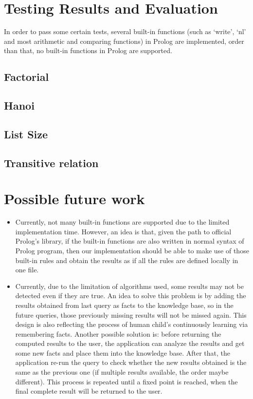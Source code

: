 \documentclass[11pt,a4paper]{report}
\begin{document}
\section*{Testing Results and Evaluation}
In order to pass some certain tests, several built-in functions (such as `write', `nl' and most arithmetic and comparing functions) in Prolog are implemented, order than that, no built-in functions in Prolog are supported.
\subsection*{Factorial}






\subsection*{Hanoi}



\subsection*{List Size}


\subsection*{Transitive relation}



\section*{Possible future work}
\begin{itemize}
	\item Currently, not many built-in functions are supported due to the limited implementation time. However, an idea is that, given the path to official Prolog's library, if the built-in functions are also written in normal syntax of Prolog program, then our implementation should be able to make use of those built-in rules and obtain the results as if all the rules are defined locally in one file.
	
	\item Currently, due to the limitation of algorithms used, some results may not be detected even if they are true. An idea to solve this problem is by adding the results obtained from last query as facts to the knowledge base, so in the future queries, those previously missing results will not be missed again. This design is also reflecting the process of  human child's continuously learning via remembering facts. Another possible solution is: before returning the computed results to the user, the application can analyze the results and get some new facts and place them into the knowledge base. After that, the application re-run the query to check whether the new results obtained is the same as the previous one (if multiple results available, the order maybe different). This process is repeated until a fixed point is reached, when the final complete result will be returned to the user. 
\end{itemize}
\end{document}
